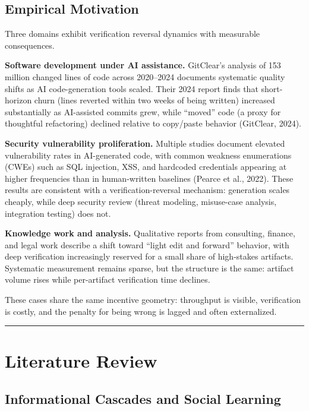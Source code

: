 \documentclass[11pt,a4paper]{article}
\begin{document}
\hypertarget{empirical-motivation}{%
\subsection{ Empirical Motivation}\label{empirical-motivation}}

Three domains exhibit verification reversal dynamics with measurable consequences.

\textbf{Software development under AI assistance.} GitClear's analysis of 153 million changed lines of code across 2020--2024 documents systematic quality shifts as AI code-generation tools scaled. Their 2024 report finds that short-horizon churn (lines reverted within two weeks of being written) increased substantially as AI-assisted commits grew, while ``moved'' code (a proxy for thoughtful refactoring) declined relative to copy/paste behavior (GitClear, 2024).

\textbf{Security vulnerability proliferation.} Multiple studies document elevated vulnerability rates in AI-generated code, with common weakness enumerations (CWEs) such as SQL injection, XSS, and hardcoded credentials appearing at higher frequencies than in human-written baselines (Pearce et al., 2022). These results are consistent with a verification-reversal mechanism: generation scales cheaply, while deep security review (threat modeling, misuse-case analysis, integration testing) does not.

\textbf{Knowledge work and analysis.} Qualitative reports from consulting, finance, and legal work describe a shift toward ``light edit and forward'' behavior, with deep verification increasingly reserved for a small share of high-stakes artifacts. Systematic measurement remains sparse, but the structure is the same: artifact volume rises while per-artifact verification time declines.

These cases share the same incentive geometry: throughput is visible, verification is costly, and the penalty for being wrong is lagged and often externalized.

\begin{center}\rule{0.5\linewidth}{0.5pt}\end{center}

\hypertarget{literature-review}{%
\section{Literature Review}\label{literature-review}}

\hypertarget{informational-cascades-and-social-learning}{%
\subsection{ Informational Cascades and Social Learning}\label{informational-cascades-and-social-learning}}
\end{document}
